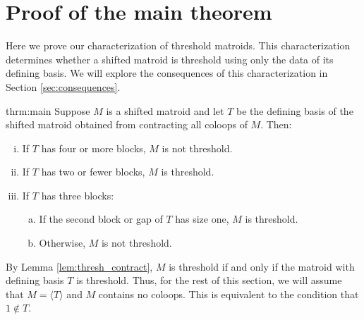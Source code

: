 \documentclass{amsart}
\theoremstyle{definition}
\theoremstyle{plain}
\begin{document}
\section{Proof of the main theorem}
\label{sec:main}

Here we prove our characterization of threshold matroids. This characterization determines whether a shifted matroid is threshold using only the data of its defining basis. We will explore the consequences of this characterization in Section \ref{sec:consequences}.
\begin{repintrotheorem}{thrm:main}
Suppose $M$ is a shifted matroid and let $T$ be the defining basis of the shifted matroid obtained from contracting all coloops of $M$.
Then:
\begin{enumerate}[i)]
\item \label{thrm:main_i}If $T$ has four or more blocks, $M$ is not threshold.
\item \label{thrm:main_ii}If $T$ has two or fewer blocks, $M$ is threshold.
\item If $T$ has three blocks:
\begin{enumerate}[a)]
\item \label{thrm:main_iiia}If the second block or gap of $T$ has size one, $M$ is threshold.
\item \label{thrm:main_iiib}Otherwise, $M$ is not threshold. 
\end{enumerate}
\end{enumerate}
\end{repintrotheorem}
By Lemma \ref{lem:thresh_contract}, $M$ is threshold if and only if the matroid with defining basis $T$ is threshold. Thus, for the rest of this section, we will assume that $M=\langle T \rangle$ and $M$ contains no coloops. This is equivalent to the condition that $1\not \in T$.
\end{document}

